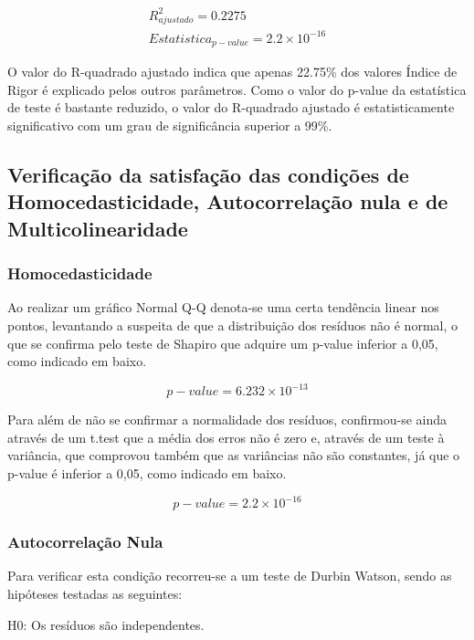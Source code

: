 \documentclass[conference]{IEEEtran}
\begin{document}
\begin{equation}
\begin{array}{l}
	R^{2}_{ajustado}=0.2275 \\
	Estatistica _{p-value}=2.2\times 10^{-16}
\end{array}
\end{equation}

O valor do R-quadrado ajustado indica que apenas 22.75\% dos valores Índice de Rigor é explicado pelos outros parâmetros. Como o valor do p-value da estatística de teste é bastante reduzido, o valor do R-quadrado ajustado é estatisticamente significativo com um grau de significância superior a 99\%.

\subsection{Verificação da satisfação das condições de Homocedasticidade, Autocorrelação nula e de Multicolinearidade}

\subsubsection{Homocedasticidade} 
Ao realizar um gráfico Normal Q-Q denota-se uma certa tendência linear nos pontos, levantando a suspeita de que a distribuição dos resíduos não é normal, o que se confirma pelo teste de Shapiro que adquire um p-value inferior a 0,05, como indicado em baixo.

\begin{equation}
p-value = 6.232\times 10^{-13}\label{eq}
\end{equation}

Para além de não se confirmar a normalidade dos resíduos, confirmou-se ainda através de um t.test que a média dos erros não é zero e, através de um teste à variância, que comprovou também que as variâncias não são constantes, já que o p-value é inferior a 0,05, como indicado em baixo.

\begin{equation}
p-value = 2.2\times 10^{-16}\label{eq}
\end{equation}

\subsubsection{Autocorrelação Nula} 
Para verificar esta condição recorreu-se a um teste de Durbin Watson, sendo as hipóteses testadas as seguintes:

H0: Os resíduos são independentes.
\end{document}
